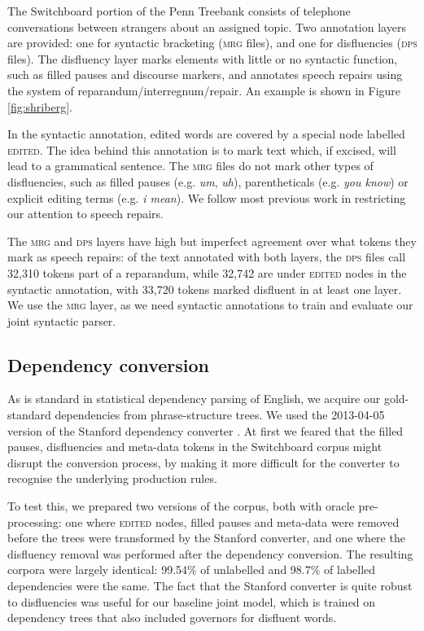 \documentclass[11pt,letterpaper]{article}
\begin{document}
The Switchboard portion of the Penn Treebank \citep{marcus:93} consists of
telephone conversations between strangers about
an assigned topic.  Two annotation layers are provided: one for syntactic
bracketing (\textsc{mrg} files),
and one for disfluencies (\textsc{dps} files).  The disfluency layer marks
elements with little or no syntactic function, such as filled pauses and discourse
markers, and annotates speech repairs using the \citet{shriberg:94} system of
reparandum/interregnum/repair. An example is shown in Figure \ref{fig:shriberg}.

In the syntactic annotation, edited words are covered by a special node labelled
\textsc{edited}.
The idea behind this annotation is to mark text which, if
excised, will lead to a grammatical sentence.  The \textsc{mrg} files do not
mark other types of disfluencies, such as filled pauses (e.g. \emph{um}, \emph{uh}),
parentheticals (e.g. \emph{you know}) or explicit editing terms (e.g. \emph{i mean}).
We follow most previous work in restricting our attention to speech repairs.

The \textsc{mrg} and \textsc{dps} layers have high but imperfect agreement over
what tokens they mark as speech repairs: of the text annotated with both layers,
the \textsc{dps} files call 32,310 tokens part of a reparandum, while 32,742 are
under \textsc{edited} nodes in the syntactic annotation, with 33,720 tokens marked
disfluent in at least one layer. We use the \textsc{mrg} layer, as we need syntactic
annotations to train and evaluate our joint syntactic parser.

\subsection{Dependency conversion}

\label{sec:deps}
As is standard in statistical dependency parsing of English, we acquire our
gold-standard dependencies from phrase-structure trees.
We used the 2013-04-05 version of the Stanford dependency converter \citep{stanford_deps}.
At first we feared that the filled pauses, disfluencies and meta-data tokens in
the Switchboard corpus might disrupt the conversion process, by making it more
difficult for the converter to recognise the underlying production rules.

To test this, we prepared two versions of the corpus, both with oracle pre-processing:
one where \textsc{edited} nodes, filled pauses and meta-data were removed before
the trees were transformed by the Stanford converter, and one where the disfluency
removal was performed after the dependency conversion. The resulting corpora
were largely identical: 99.54\% of unlabelled and 98.7\% of labelled dependencies
were the same. The fact that the Stanford converter is quite robust to disfluencies
was useful for our baseline joint model, which is
trained on dependency trees that also included governors for disfluent words.
\end{document}
